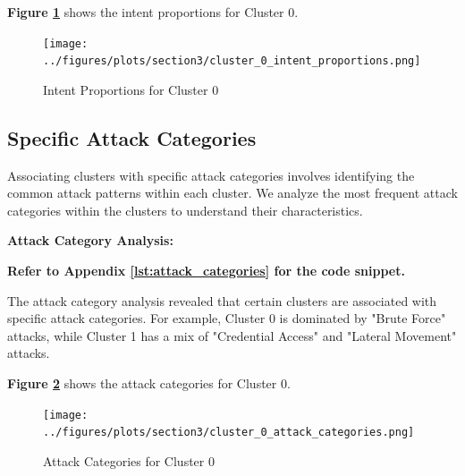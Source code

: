         \textbf{Figure \ref{fig:intent-proportions}} shows the intent proportions for Cluster 0.

        \begin{figure}[h]
            \centering
            \texttt{[image: ../figures/plots/section3/cluster\_0\_intent\_proportions.png]}
            \caption{Intent Proportions for Cluster 0}
            \label{fig:intent-proportions}
        \end{figure}
        
    \subsection{Specific Attack Categories}
    
        Associating clusters with specific attack categories involves identifying the common attack patterns within each cluster. We analyze the most frequent attack categories within the clusters to understand their characteristics.

        \textbf{Attack Category Analysis:}
        
        \vspace{0.5em}

        \textbf{Refer to Appendix \ref{lst:attack_categories} for the code snippet.}

        The attack category analysis revealed that certain clusters are associated with specific attack categories. For example, Cluster 0 is dominated by "Brute Force" attacks, while Cluster 1 has a mix of "Credential Access" and "Lateral Movement" attacks.

        \textbf{Figure \ref{fig:attack-categories}} shows the attack categories for Cluster 0.

        \begin{figure}[h]
            \centering
            \texttt{[image: ../figures/plots/section3/cluster\_0\_attack\_categories.png]}
            \caption{Attack Categories for Cluster 0}
            \label{fig:attack-categories}
        \end{figure}
        